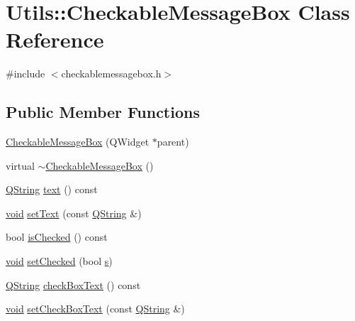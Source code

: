 \hypertarget{class_utils_1_1_checkable_message_box}{\section{\-Utils\-:\-:\-Checkable\-Message\-Box \-Class \-Reference}
\label{class_utils_1_1_checkable_message_box}
}


{\ttfamily \#include $<$checkablemessagebox.\-h$>$}

\subsection*{\-Public \-Member \-Functions}
\begin{DoxyCompactItemize}
\item 
\hyperlink{class_utils_1_1_checkable_message_box_a8aeacdf27f60a7d5df576830a2961f9d}{\-Checkable\-Message\-Box} (\-Q\-Widget $\ast$parent)
\item 
virtual \hyperlink{class_utils_1_1_checkable_message_box_a941dd115116674416d90e8c199945162}{$\sim$\-Checkable\-Message\-Box} ()
\item 
\hyperlink{group___u_a_v_objects_plugin_gab9d252f49c333c94a72f97ce3105a32d}{\-Q\-String} \hyperlink{class_utils_1_1_checkable_message_box_ab5f8fab0128931194df6cbfae5ec239f}{text} () const 
\item 
\hyperlink{group___u_a_v_objects_plugin_ga444cf2ff3f0ecbe028adce838d373f5c}{void} \hyperlink{class_utils_1_1_checkable_message_box_a7d5fad3765d806b6f123092a981fd3d8}{set\-Text} (const \hyperlink{group___u_a_v_objects_plugin_gab9d252f49c333c94a72f97ce3105a32d}{\-Q\-String} \&)
\item 
bool \hyperlink{class_utils_1_1_checkable_message_box_ad9d64b80175be2daccaca8f6dbeb258d}{is\-Checked} () const 
\item 
\hyperlink{group___u_a_v_objects_plugin_ga444cf2ff3f0ecbe028adce838d373f5c}{void} \hyperlink{class_utils_1_1_checkable_message_box_a7e33fe6bbc0aada5a8cd676d3c45cb27}{set\-Checked} (bool \hyperlink{uavobjecttemplate_8m_a3691308f2a4c2f6983f2880d32e29c84}{s})
\item 
\hyperlink{group___u_a_v_objects_plugin_gab9d252f49c333c94a72f97ce3105a32d}{\-Q\-String} \hyperlink{class_utils_1_1_checkable_message_box_ae0cc594421977656bfc114a3a3d1b491}{check\-Box\-Text} () const 
\item 
\hyperlink{group___u_a_v_objects_plugin_ga444cf2ff3f0ecbe028adce838d373f5c}{void} \hyperlink{class_utils_1_1_checkable_message_box_a61df735b4b31dbafba41a08706d3acb9}{set\-Check\-Box\-Text} (const \hyperlink{group___u_a_v_objects_plugin_gab9d252f49c333c94a72f97ce3105a32d}{\-Q\-String} \&)

\end{DoxyCompactItemize}
